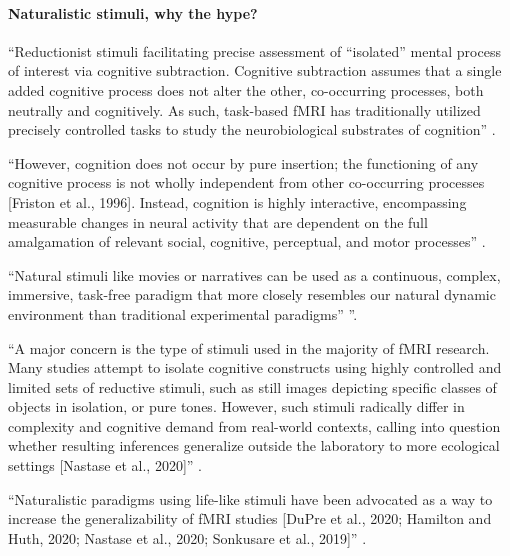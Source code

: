 \paragraph{Naturalistic stimuli, why the hype?}

%
``Reductionist stimuli facilitating precise assessment of “isolated” mental
process of interest via cognitive subtraction.
%
Cognitive subtraction assumes that a single added cognitive process does not
alter the other, co-occurring processes, both neutrally and cognitively.
%
As such, task-based fMRI has traditionally utilized precisely controlled tasks
to study the neurobiological substrates of cognition''
\citep{bottenhorn2018cooperating}.

%
``However, cognition does not occur by pure insertion;
%
the functioning of any cognitive process is not wholly independent from other
co-occurring processes [Friston et al., 1996].
%
Instead, cognition is highly interactive, encompassing measurable changes in
neural activity that are dependent on the full amalgamation of relevant social,
cognitive, perceptual, and motor processes'' \citep{bottenhorn2018cooperating}.



``Natural stimuli like movies \citep{eickhoff2020towards,
hasson2008neurocinematics, sonkusare2019naturalistic} or narratives
\citep{hamilton2018revolution, honey2012not, lerner2011topographic,
silbert2014coupled, wilson2008beyond} can be used as a continuous, complex,
immersive, task-free paradigm that more closely resembles our natural dynamic
environment than traditional experimental paradigms''
\citep{haeusler2022processing}''.

``A major concern is the type of stimuli used in the majority of fMRI research.
Many studies attempt to isolate cognitive constructs using highly controlled and
limited sets of reductive stimuli, such as still images depicting specific
classes of objects in isolation, or pure tones.
%
However, such stimuli radically differ in complexity and cognitive demand from
real-world contexts, calling into question whether resulting inferences
generalize outside the laboratory to more ecological settings [Nastase et al.,
2020]'' \citep{delavega2022neuroscout}.

%
``Naturalistic paradigms using life-like stimuli have been advocated as a way to
increase the generalizability of fMRI studies [DuPre et al., 2020; Hamilton and
Huth, 2020; Nastase et al., 2020; Sonkusare et al., 2019]''
\citep{delavega2022neuroscout}.

